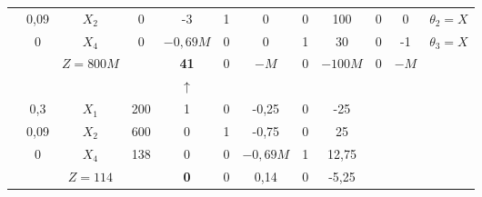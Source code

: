 \begin{tabular}{cccccccccccc}
            & 0,09    & $X_2$   & 0       & -3      & 1       & 0       & 0       & 100     & 0       & 0       & $\theta_2 = X$ \\
            & 0       & $X_4$   & 0       & $-0,69 M$ & 0       & 0       & 1       & 30      & 0       & -1      & $\theta_3 = X$ \\
\cmidrule{2-12}            &         & $Z=800M$ &         & \textcolor[rgb]{ 0,  .439,  .753}{\textbf{41}} & 0       & $-M$    & 0       & $-100 M$ & 0       & $-M$    &  \\
\cmidrule{2-12}            &         &         &         & $\uparrow$ &         &         &         &         &         &         &  \\
\cmidrule{2-12}            & 0,3     & $X_1$   & 200     & 1       & 0       & -0,25   & 0       & -25     &         &         &  \\
            & 0,09    & $X_2$   & 600     & 0       & 1       & -0,75   & 0       & 25      &         &         &  \\
            & 0       & $X_4$   & 138     & 0       & 0       & $-0,69 M$ & 1       & 12,75   &         &         &  \\
\cmidrule{2-9}            &         & $Z=114$ &         & \textcolor[rgb]{ 0,  .439,  .753}{\textbf{0}} & 0       & 0,14    & 0       & -5,25   &         &         &  \\
\cmidrule{2-9}    \end{tabular}%

